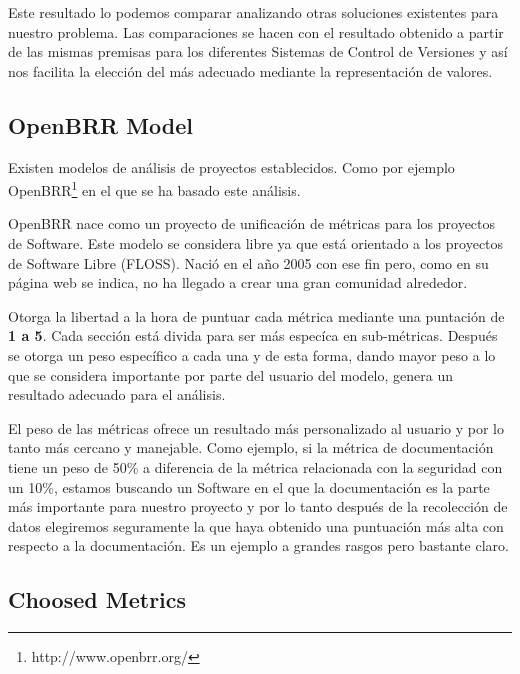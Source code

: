 \documentclass[11pt]{scrartcl}
\begin{document}
\par Este resultado lo podemos comparar analizando otras soluciones existentes para nuestro problema.
Las comparaciones se hacen con el resultado obtenido a partir de las mismas premisas para los diferentes Sistemas de Control de Versiones y as\'i nos facilita la elecci\'on del m\'as adecuado mediante la representaci\'on de valores.

\subsection{OpenBRR Model}

\par Existen modelos de an\'alisis de proyectos establecidos. Como por ejemplo OpenBRR\footnote{http://www.openbrr.org/} en el que se ha basado este an\'alisis. 

\par OpenBRR nace como un proyecto de unificaci\'on de m\'etricas para los proyectos de Software. Este modelo se considera libre ya que est\'a orientado a los proyectos de Software Libre (FLOSS). Naci\'o en el a\~no 2005 con ese fin pero, como en su p\'agina web se indica, no ha llegado a crear una gran comunidad alrededor.

\par Otorga la libertad a la hora de puntuar cada m\'etrica mediante una puntaci\'on de \textbf{1 a 5}. Cada secci\'on est\'a divida para ser m\'as espec\'ica en sub-m\'etricas. Despu\'es se otorga un peso espec\'ifico a cada una y de esta forma, dando mayor peso a lo que se considera importante por parte del usuario del modelo, genera un resultado adecuado para el an\'alisis.

\par El peso de las m\'etricas ofrece un resultado m\'as personalizado al usuario y por lo tanto m\'as cercano y manejable. Como ejemplo, si la m\'etrica de documentaci\'on tiene un peso de 50\% a diferencia de la m\'etrica relacionada con la seguridad con un 10\%, estamos buscando un Software en el que la documentaci\'on es la parte m\'as importante para nuestro proyecto y por lo tanto despu\'es de la recolecci\'on de datos elegiremos seguramente la que haya obtenido una puntuaci\'on m\'as alta con respecto a la documentaci\'on. Es un ejemplo a grandes rasgos pero bastante claro.

\subsection{Choosed Metrics}
\end{document}
